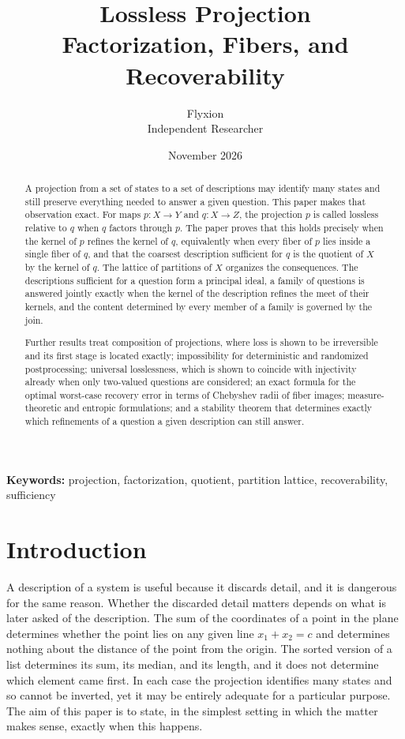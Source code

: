 \documentclass[11pt]{article}
\title{Lossless Projection\\[0.5em]\large Factorization, Fibers, and Recoverability}
\author{Flyxion\\[0.2em]\small Independent Researcher}
\date{November 2026}
\theoremstyle{definition}
\theoremstyle{remark}
\begin{document}
\maketitle

\begin{abstract}
\noindent
A projection from a set of states to a set of descriptions may identify many states and still preserve everything needed to answer a given question. This paper makes that observation exact. For maps $p:X\to Y$ and $q:X\to Z$, the projection $p$ is called lossless relative to $q$ when $q$ factors through $p$. The paper proves that this holds precisely when the kernel of $p$ refines the kernel of $q$, equivalently when every fiber of $p$ lies inside a single fiber of $q$, and that the coarsest description sufficient for $q$ is the quotient of $X$ by the kernel of $q$. The lattice of partitions of $X$ organizes the consequences. The descriptions sufficient for a question form a principal ideal, a family of questions is answered jointly exactly when the kernel of the description refines the meet of their kernels, and the content determined by every member of a family is governed by the join. \par\medskip\noindent Further results treat composition of projections, where loss is shown to be irreversible and its first stage is located exactly; impossibility for deterministic and randomized postprocessing; universal losslessness, which is shown to coincide with injectivity already when only two-valued questions are considered; an exact formula for the optimal worst-case recovery error in terms of Chebyshev radii of fiber images; measure-theoretic and entropic formulations; and a stability theorem that determines exactly which refinements of a question a given description can still answer.
\end{abstract}

\vspace{2.5em}
\noindent\textbf{Keywords:} projection, factorization, quotient, partition lattice, recoverability, sufficiency

\newpage

\section{Introduction}

A description of a system is useful because it discards detail, and it is dangerous for the same reason. Whether the discarded detail matters depends on what is later asked of the description. The sum of the coordinates of a point in the plane determines whether the point lies on any given line $x_1+x_2=c$ and determines nothing about the distance of the point from the origin. The sorted version of a list determines its sum, its median, and its length, and it does not determine which element came first. In each case the projection identifies many states and so cannot be inverted, yet it may be entirely adequate for a particular purpose. The aim of this paper is to state, in the simplest setting in which the matter makes sense, exactly when this happens.
\end{document}
